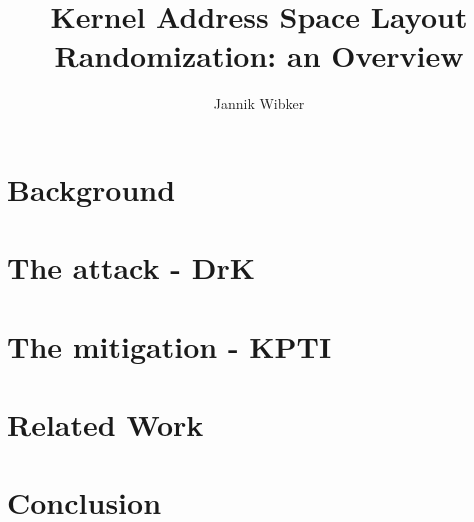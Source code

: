\documentclass[10pt,twocolumn,a4paper]{article}
\author{Jannik Wibker}
\begin{document}
\title{ Kernel Address Space Layout Randomization: an Overview }

\newcommand{\todo}[1]{{\texttt{[#1]}}}
\newcommand{\code}[1]{{\tt \small{#1}}}

\maketitle

\begin{abstract}

\end{abstract}

\section{Background}\label{sec:background}



\section{The attack - DrK}\label{sec:drk}



\section{The mitigation - KPTI}\label{sec:kpti}



\section{Related Work}\label{sec:relwork}



\section{Conclusion}\label{sec:conclusion}





\end{document}
